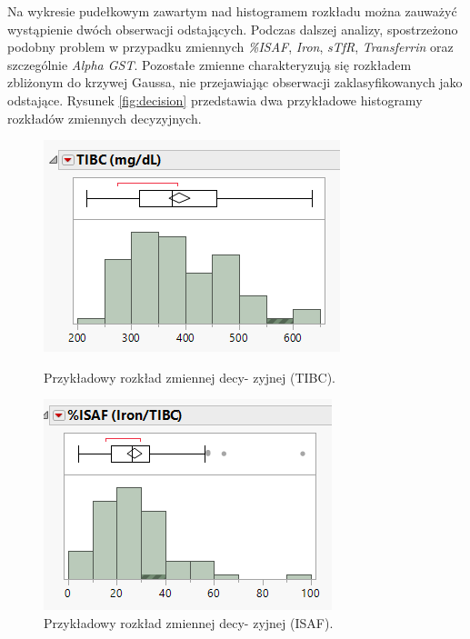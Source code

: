 	Na wykresie pudełkowym zawartym nad histogramem rozkładu można zauważyć wystąpienie dwóch obserwacji odstających. Podczas dalszej analizy, spostrzeżono podobny problem w przypadku zmiennych \textit{\%ISAF}, \textit{Iron}, \textit{sTfR}, \textit{Transferrin} oraz szczególnie \textit{Alpha GST}. Pozostałe zmienne charakteryzują się rozkładem zbliżonym do krzywej Gaussa, nie przejawiając obserwacji zaklasyfikowanych jako odstające. Rysunek \ref{fig:decision} przedstawia dwa przykładowe histogramy rozkładów zmiennych decyzyjnych.
	
	\begin{figure}[!ht]
		\begin{minipage}{0.40\textwidth}
			\centering
			\includegraphics[width=0.9\linewidth]{Rozdzial3/decision}
			\caption{Przykładowy rozkład zmiennej decy- zyjnej (TIBC).}
			\label{fig:decision}		
		\end{minipage}%
		\hspace{0.10\textwidth}
		\begin{minipage}{0.40\textwidth}
			\centering
			\includegraphics[width=0.9\linewidth]{Rozdzial3/decision1}
			\caption{Przykładowy rozkład zmiennej decy- zyjnej (ISAF).}
			\label{fig:decision1}			
		\end{minipage}
	\end{figure}
	
